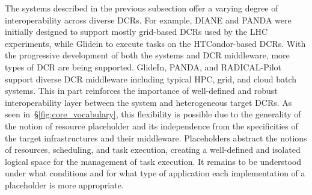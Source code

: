 \documentclass{sig-alternate}
\begin{document}




The \pilot systems described in the previous subsection offer a varying degree
of interoperability across diverse DCRs. For example, DIANE and PANDA were
initially designed to support mostly grid-based DCRs used by the LHC
experiments, while Glidein to execute tasks on the HTCondor-based DCRs. With the
progressive development of both the \pilot systems and DCR middleware, more
types of DCR are being supported.  GlideIn, PANDA, and RADICAL-Pilot support
diverse DCR middleware including typical HPC, grid, and cloud batch systems.
This in part reinforces the importance of well-defined and robust
interoperability layer between the \pilot system and heterogeneous target DCRs.
As seen in~\S\ref{fig:core_vocabulary}, this flexibility is possible due to the
generality of the notion of resource placeholder and its independence from the
specificities of the target infrastructures and their middleware. Placeholders
abstract the notions of resources, scheduling, and task execution, creating a
well-defined and isolated logical space for the management of task execution.
It remains to be understood under what conditions and for what type of
application each implementation of a placeholder is more appropriate.










\end{document}
